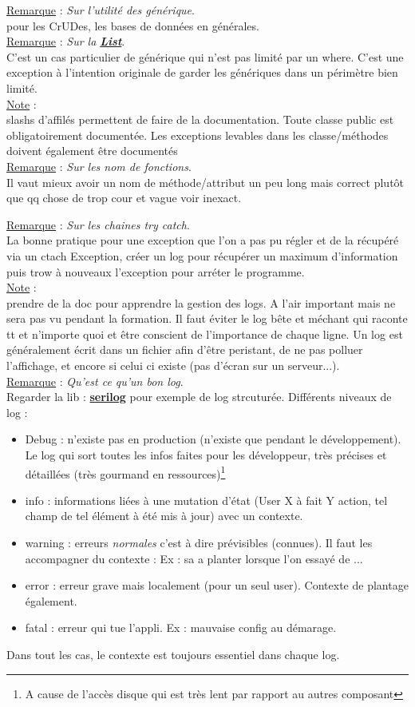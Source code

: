 \documentclass[a4paper,12pt,twoside]{article}
\newcommand{\urlcolor}{magenta}  %
\newcommand{\keycolor}{purple} %
\newcommand{\incode}[1]{{\footnotesize\ttfamily #1}} %
\newcommand{\rem}[2]{\noindent\underline{Remarque} : \textit{#1}.\\ \indent #2}
\newcommand{\note}[1]{\noindent\underline{Note} : \\ \indent #1}
\newcommand{\keyref}[2]{\hypersetup{urlcolor=\keycolor} \href{#1}{\textbf{#2}}\hypersetup{urlcolor=\urlcolor}}
\begin{document}
\rem{Sur l'utilité des générique}{pour les CrUDes, les bases de données en générales.}\\

\rem{Sur la \keyref{https://docs.microsoft.com/fr-fr/dotnet/api/system.collections.generic.list-1?view=net-6.0}{List}}{C'est un cas particulier de générique qui n'est pas limité par un \incode{where}. C'est une exception à l'intention originale de garder les génériques dans un périmètre bien limité.}\\

\note{3 slashs d'affilés permettent de faire de la documentation. Toute classe public est obligatoirement documentée. Les exceptions levables dans les classe/méthodes doivent également être documentés}\\

\rem{Sur les nom de fonctions}{Il vaut mieux avoir un nom de méthode/attribut un peu long mais correct plutôt que qq chose de trop cour et vague voir inexact.}

\rem{Sur les chaines \incode{try catch}}{La bonne pratique pour une exception que l'on a pas pu régler et de la récupéré via un ctach \incode{Exception}, créer un log pour récupérer un maximum d'information puis trow à nouveaux l'exception pour arréter le programme.}\\

\note{prendre de la doc pour apprendre la gestion des logs. A l'air important mais ne sera pas vu pendant la formation. Il faut éviter le log bête et méchant qui raconte tt et n'importe quoi et être conscient de l'importance de chaque ligne. Un log est généralement écrit dans un fichier afin d'être peristant, de ne pas polluer l'affichage, et encore si celui ci existe (pas d'écran sur un serveur...).}\\

\rem{Qu'est ce qu'un bon log}{Regarder la lib : \keyref{https://serilog.net/}{serilog} pour exemple de log strcuturée. Différents niveaux de log : 
\begin{itemize}
 \item Debug : n'existe pas en production (n'existe que pendant le développement). Le log qui sort toutes les infos faites pour les développeur, très précises et détaillées (très gourmand en ressources)\footnote{A cause de l'accès disque qui est très lent par rapport au autres composant}
 \item info : informations liées à une mutation d'état (User X à fait Y action, tel champ de tel élément à été mis à jour) avec un contexte.
 \item warning : erreurs \textit{normales} c'est à dire prévisibles (connues). Il faut les accompagner du contexte : Ex : sa a planter lorsque l'on essayé de ...
 \item error :  erreur grave mais localement (pour un seul user). Contexte de plantage également.
 \item fatal : erreur qui tue l'appli. Ex : mauvaise config au démarage.
\end{itemize}
Dans tout les cas, le contexte est toujours essentiel dans chaque log.}\\
\end{document}
